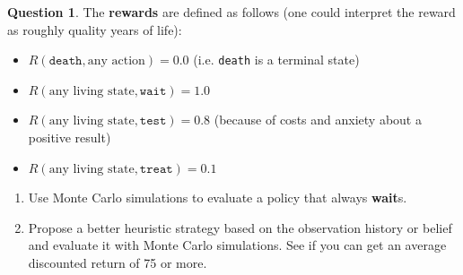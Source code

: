 \documentclass{article}
\theoremstyle{definition}
\newtheorem{question}[thm]{Question}
\begin{document}
\begin{question}
The \textbf{rewards} are defined as follows (one could interpret the reward as roughly quality years of life):
\begin{itemize}[noitemsep]
    \item $R(\texttt{death}, \text{any action}) = 0.0$ (i.e. \texttt{death} is a terminal state)
    \item $R(\text{any living state}, \texttt{wait}) = 1.0$
    \item $R(\text{any living state}, \texttt{test}) = 0.8$ (because of costs and anxiety about a positive result)
    \item $R(\text{any living state}, \texttt{treat}) = 0.1$
\end{itemize}

\begin{enumerate}[label=(\alph*)]
    \item Use Monte Carlo simulations to evaluate a policy that always \textbf{wait}s.
    \item Propose a better heuristic strategy based on the observation history or belief and evaluate it with Monte Carlo simulations. See if you can get an average discounted return of 75 or more.
\end{enumerate}

\end{question}
\end{document}
